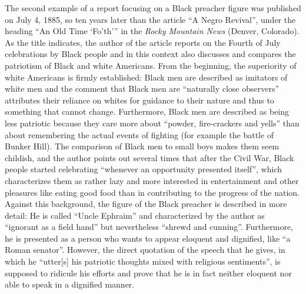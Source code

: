 The second example of a report focusing on a Black preacher figure was published on July 4, 1885, so ten years later than the article “A Negro Revival”, under the heading “An Old Time ‘Fo’th’” in the \emph{Rocky Mountain News} (Denver, Colorado). As the title indicates, the author of the article reports on the Fourth of July celebrations by Black people and in this context also discusses and compares the patriotism of Black and white Americans. From the beginning, the superiority of white Americans is firmly established: Black men are described as imitators of white men and the comment that Black men are “naturally close observers” attributes their reliance on whites for guidance to their nature and thus to something that cannot change. Furthermore, Black men are described as being less patriotic because they care more about “powder, fire-crackers and yells” than about remembering the actual events of fighting (for example the battle of Bunker Hill). The comparison of Black men to small boys makes them seem childish, and the author points out several times that after the Civil War, Black people started celebrating “whenever an opportunity presented itself”, which characterizes them as rather lazy and more interested in entertainment and other pleasures like eating good food than in contributing to the progress of the nation. Against this background, the figure of the Black preacher is described in more detail: He is called “Uncle Ephraim” and characterized by the author as “ignorant as a field hand” but nevertheless “shrewd and cunning”. Furthermore, he is presented as a person who wants to appear eloquent and dignified, like “a Roman senator”. However, the direct quotation of the speech that he gives, in which he “utter[s] his patriotic thoughts mixed with religious sentiments”, is supposed to ridicule his efforts and prove that he is in fact neither eloquent nor able to speak in a dignified manner.

